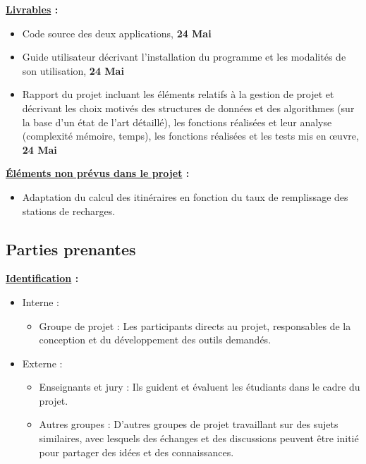 \documentclass[a4paper, 12pt]{report}
\begin{document}
\textbf{\underline{Livrables} :}
\begin{itemize}
    \item Code source des deux applications, \textbf{24 Mai}
    \item Guide utilisateur décrivant l'installation du programme et les modalités de son utilisation, \textbf{24 Mai}
    \item Rapport du projet incluant les éléments relatifs à la gestion de projet et décrivant les choix motivés des structures de données et des algorithmes (sur la base d'un état de l'art détaillé), les
          fonctions réalisées et leur analyse (complexité mémoire, temps), les fonctions réalisées et les tests mis en œuvre, \textbf{24 Mai}
\end{itemize}
\bigskip

\textbf{\underline{Éléments non prévus dans le projet} :}
\begin{itemize}
    \item Adaptation du calcul des itinéraires en fonction du taux de remplissage des stations de recharges.
\end{itemize}

\subsection{Parties prenantes}

\textbf{\underline{Identification} :}
\begin{itemize}
    \item Interne :
          \begin{itemize}
              \item Groupe de projet : Les participants directs au projet, responsables de la conception et du développement des outils demandés.
          \end{itemize}
    \item Externe :
          \begin{itemize}
              \item Enseignants et jury : Ils guident et évaluent les étudiants dans le cadre du projet.
              \item Autres groupes : D'autres groupes de projet travaillant sur des sujets similaires, avec lesquels des échanges et des discussions peuvent être initié pour partager des idées et des connaissances.
          \end{itemize}
\end{itemize}
\bigskip
\end{document}
